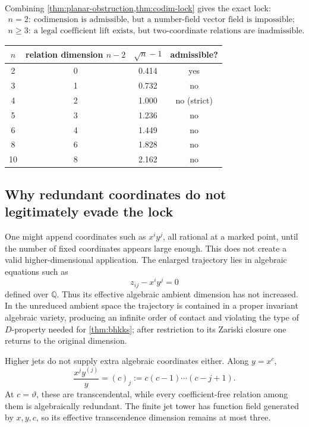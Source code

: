 \documentclass[10pt,oneside]{article}
\theoremstyle{definition}
\theoremstyle{remark}
\newcommand{\Q}{\mathbb Q}
\newcommand{\thetaq}{\vartheta}
\begin{document}
Combining \cref{thm:planar-obstruction,thm:codim-lock} gives the exact lock:
\begin{equation}
 \boxed{
 \begin{array}{c}
 n=2:\ \text{codimension is admissible, but a number-field vector field is impossible};\\[2mm]
 n\ge3:\ \text{a legal coefficient lift exists, but two-coordinate relations are inadmissible}.
 \end{array}}
\label{eq:coefficient-codimension-lock}
\end{equation}

\begin{center}
\begin{tabular}{c c c c}
\toprule
\(n\) & relation dimension \(n-2\) & \(\sqrt n-1\) & admissible? \\
\midrule
2 & 0 & 0.414 & yes \\
3 & 1 & 0.732 & no \\
4 & 2 & 1.000 & no (strict) \\
5 & 3 & 1.236 & no \\
6 & 4 & 1.449 & no \\
8 & 6 & 1.828 & no \\
10 & 8 & 2.162 & no \\
\bottomrule
\end{tabular}
\end{center}

\subsection{Why redundant coordinates do not legitimately evade the lock}
One might append coordinates such as \(x^iy^j\), all rational at a marked point, until the number of fixed coordinates appears large enough.  This does not create a valid higher-dimensional application.  The enlarged trajectory lies in algebraic equations such as
\[
 z_{ij}-x^iy^j=0
\]
defined over \(\Q\).  Thus its effective algebraic ambient dimension has not increased.  In the unreduced ambient space the trajectory is contained in a proper invariant algebraic variety, producing an infinite order of contact and violating the type of \(D\)-property needed for \cref{thm:bhkks}; after restriction to its Zariski closure one returns to the original dimension.

Higher jets do not supply extra algebraic coordinates either.  Along \(y=x^c\),
\begin{equation}
 \frac{x^j y^{(j)}}y=(c)_j:=c(c-1)\cdots(c-j+1).
\label{eq:jet-falling-factorial}
\end{equation}
At \(c=\thetaq\), these are transcendental, while every coefficient-free relation among them is algebraically redundant.  The finite jet tower has function field generated by \(x,y,c\), so its effective transcendence dimension remains at most three.
\end{document}
